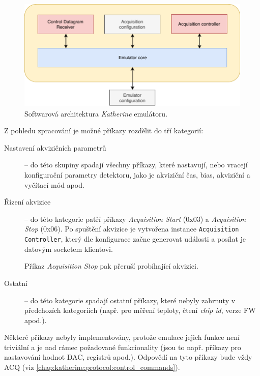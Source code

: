 \begin{figure}[h]
	\begin{center}
		\includegraphics[width=14cm]{figures/katherine_emulator_arch.pdf}
		\caption{Softwarová architektura \textit{Katherine} emulátoru.}
		\label{fig:katherine:emulator:arch}
	\end{center}
\end{figure}

Z pohledu zpracování je možné příkazy rozdělit do tří kategorií:
\begin{description}
    \item[Nastavení akvizičních parametrů] -- do této skupiny spadají všechny příkazy, které nastavují, nebo vracejí konfigurační parametry detektoru, jako je akviziční čas, bias, akviziční a vyčítací mód apod.
    \item[Řízení akvizice] -- do této kategorie patří příkazy \textit{Acquisition Start} (0x03) a \textit{Acquisition Stop} (0x06). Po spuštění akvizice je vytvořena instance \texttt{Acquisition Controller}, který dle konfigurace začne generovat události a posílat je datovým socketem klientovi.
    
    Příkaz \textit{Acquisition Stop} pak přeruší probíhající akvizici.
    \item[Ostatní] -- do této kategorie spadají ostatní příkazy, které nebyly zahrnuty v předchozích kategoriích (např. pro měření teploty, čtení \textit{chip id}, verze FW apod.).
\end{description}

Některé příkazy nebyly implementovány, protože emulace jejich funkce není triviální a je nad rámec požadované funkcionality (jsou to např. příkazy pro nastavování hodnot DAC, registrů apod.). Odpovědí na tyto příkazy bude vždy ACQ (viz \ref{chap:katherine:protocol:control_commands}).

